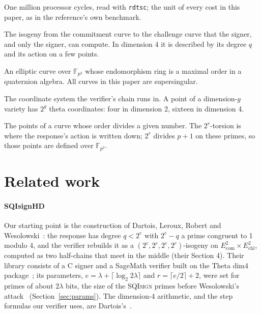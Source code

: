 \documentclass[version=preprint]{iacrcc}
\newcommand{\Ecom}{E_{\mathrm{com}}}
\newcommand{\Echl}{E_{\mathrm{chl}}}
\newcommand{\SQIsign}{SQI{\textsc{sign}}}
\begin{document}
\begin{description}[style=nextline,leftmargin=2em,font=\normalfont\itshape]
        \item[megacycle]
        One million processor cycles, read with \texttt{rdtsc}; the unit of
        every cost in this paper, as in the reference's own benchmark.
        \item[response]
        The isogeny from the commitment curve to the challenge curve that the
        signer, and only the signer, can compute. In dimension 4 it is described
        by its degree $q$ and its action on a few points.
        \item[supersingular curve]
        An elliptic curve over $\mathbb{F}_{p^2}$ whose endomorphism ring is a
        maximal order in a quaternion algebra. All curves in this paper are
        supersingular.
        \item[theta model]
        The coordinate system the verifier's chain runs in. A point of a
        dimension-$g$ variety has $2^g$ theta coordinates: four in dimension 2,
        sixteen in dimension 4.
        \item[torsion]
        The points of a curve whose order divides a given number. The
        $2^r$-torsion is where the response's action is written down; $2^r$
        divides $p + 1$ on these primes, so those points are defined over
        $\mathbb{F}_{p^2}$.
    \end{description}

    \section{Related work}
    \label{sec:related}

    \paragraph{SQIsignHD}
    Our starting point is the construction of Dartois, Leroux, Robert and
    Wesolowski~\cite{DLRW24}: the response has degree $q < 2^e$ with $2^e - q$
    a prime congruent to 1 modulo 4, and the verifier rebuilds it as a $(2^e,
    2^e, 2^e, 2^e)$-isogeny on $\Ecom^2 \times \Echl^2$, computed as two
    half-chains that meet in the middle (their Section 4). Their library
    consists of a C signer and a SageMath verifier built on the Theta dim4
    package~\cite{DLRW25,Dar25}; its parameters, $e = \lambda + \lceil \log_2
    2\lambda \rceil$ and $r = \lceil e/2 \rceil + 2$, were set for primes of
    about $2\lambda$ bits, the size of the {\SQIsign} primes before Wesolowski's
    attack~\cite{Wes26} (Section~\ref{sec:params}). The dimension-4 arithmetic, and
    the step formulas our verifier uses, are Dartois's~\cite{Dar24}.
\end{document}
